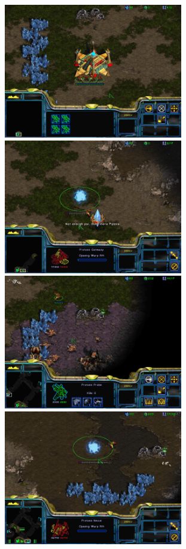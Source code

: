 \begin{figure}[!ht]
\begin{center}
\includegraphics[width=7.8cm]{images/SC_game/SC_start_game.png}
\includegraphics[width=7.8cm]{images/SC_game/SC_first_gate.png}
\includegraphics[width=7.8cm]{images/SC_game/SC_scout_opponent.png}
\includegraphics[width=7.8cm]{images/SC_game/SC_expand.png}

\end{center}
\end{figure}
